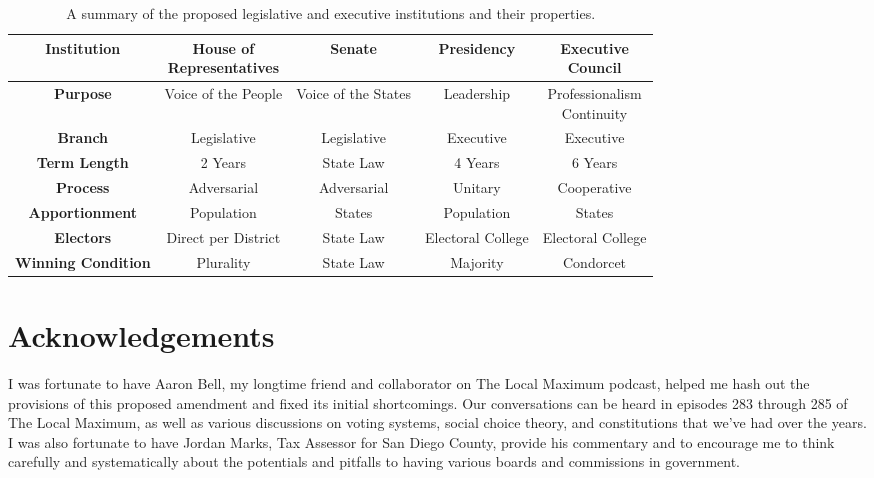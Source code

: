 \documentclass{article}
\begin{document}
\begin{table}[ht]
\centering
\renewcommand{\arraystretch}{1.5}
\begin{tabular}{|c|c|c|c|c|}
\hline
\textbf{Institution} & \makecell{House of \\ Representatives} & Senate & Presidency & \makecell{Executive \\ Council}  \\
\hline
\textbf{Purpose} & Voice of the People & Voice of the States & Leadership & \makecell{Professionalism \\ Continuity} \\
\hline
\textbf{Branch} & Legislative & Legislative & Executive & Executive \\
\hline
\textbf{Term Length} & 2 Years & State Law & 4 Years & 6 Years \\
\hline
\textbf{Process} & Adversarial & Adversarial & Unitary & Cooperative \\
\hline
\textbf{Apportionment} & Population & States & Population & States  \\
\hline
\textbf{Electors} & Direct per District & State Law  & Electoral College & Electoral College  \\
\hline
\textbf{Winning Condition} & Plurality & State Law & Majority & Condorcet  \\
\hline
\end{tabular}
\caption{A summary of the proposed legislative and executive institutions and their properties. }
\label{table:institutions}
\end{table}

\section{Acknowledgements}

I was fortunate to have Aaron Bell, my longtime friend and collaborator on The Local Maximum podcast, helped me hash out the provisions of this proposed amendment and fixed its initial shortcomings. Our conversations can be heard in episodes 283 through 285 of The Local Maximum, as well as various discussions on voting systems, social choice theory, and constitutions that we've had over the years. I was also fortunate to have Jordan Marks, Tax Assessor for San Diego County, provide his commentary and to encourage me to think carefully and systematically about the potentials and pitfalls to having various boards and commissions in government.
\end{document}
